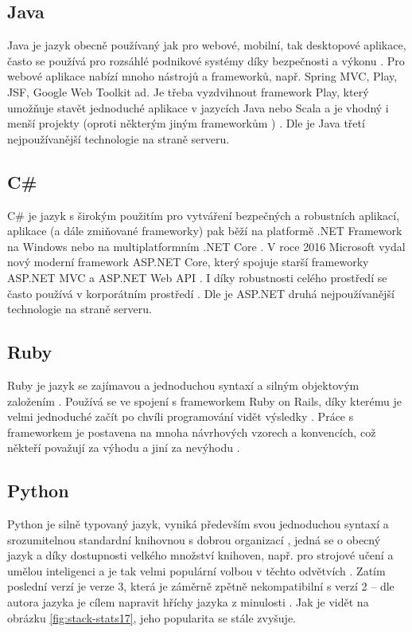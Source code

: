         \subsection{Java}
        Java je jazyk obecně používaný jak pro webové, mobilní, tak desktopové aplikace, často se používá pro rozsáhlé podnikové systémy díky bezpečnosti a výkonu \cite{tech2}. Pro webové aplikace nabízí mnoho nástrojů a frameworků, např. Spring MVC, Play, JSF, Google Web Toolkit ad. Je třeba vyzdvihnout framework Play, který umožňuje stavět jednoduché aplikace v jazycích Java nebo Scala a je vhodný i menší projekty (oproti některým jiným frameworkům \cite{tech-java1}) \cite{tech-java2}. Dle \cite{tech-php1} je Java třetí nejpoužívanější technologie na straně serveru.
        
        \subsection{C\#}
        C\# je jazyk s širokým použitím pro vytváření bezpečných a robustních aplikací, aplikace (a dále zmiňované frameworky) pak běží na platformě .NET Framework na Windows nebo na multiplatformním .NET Core \cite{tech-csharp1}. V roce 2016 Microsoft vydal nový moderní framework ASP.NET Core, který spojuje starší frameworky ASP.NET MVC a ASP.NET Web API \cite{tech-csharp1}. I díky robustnosti celého prostředí se často používá v korporátním prostředí \cite{tech-csharp3}. Dle \cite{tech-php1} je ASP.NET druhá nejpoužívanější technologie na straně serveru.
        
        \subsection{Ruby}
        Ruby je jazyk se zajímavou a jednoduchou syntaxí a silným objektovým založením \cite{tech-ruby1}.
        Používá se ve spojení s frameworkem Ruby on Rails, díky kterému je velmi jednoduché začít po chvíli programování vidět výsledky \cite{tech1}. Práce s frameworkem je postavena na mnoha návrhových vzorech a konvencích, což někteří považují za výhodu \cite{tech1} a jiní za nevýhodu \cite{tech-ruby2}.
        
        \subsection{Python}\label{sec:python}
        Python je silně typovaný jazyk, vyniká především svou jednoduchou syntaxí a srozumitelnou standardní knihovnou s dobrou organizací \cite{tech-python1}, jedná se o obecný jazyk a díky dostupnosti velkého množství knihoven, např. pro strojové učení a umělou inteligenci a je tak velmi populární volbou v těchto odvětvích \cite{tech-python3}. Zatím poslední verzí je verze 3, která je záměrně zpětně nekompatibilní s verzí 2 -- dle autora jazyka je cílem napravit hříchy jazyka z minulosti \cite{tech-python6}. Jak je vidět na obrázku \ref{fig:stack-stats17}, jeho popularita se stále zvyšuje.
        
